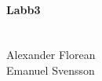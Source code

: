 \documentclass{article}
\begin{document}
\paragraph{Labb3} \\
Alexander Florean \\
Emanuel Svensson





\end{document}
